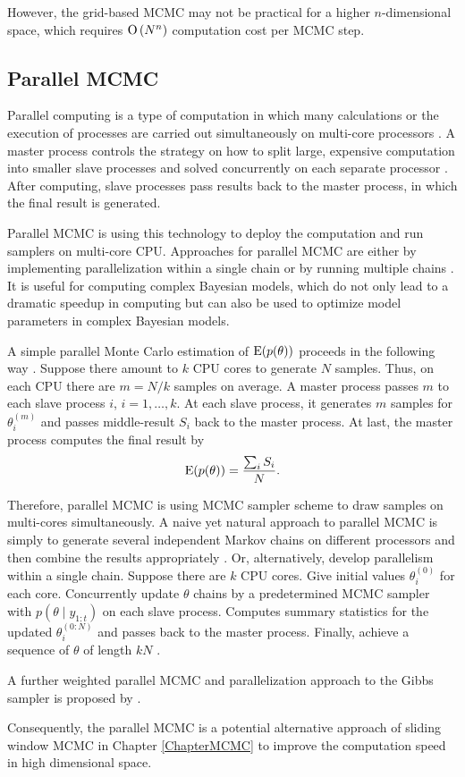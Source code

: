 However, the grid-based MCMC may not be practical for a higher $n$-dimensional space, which requires ${\rm O}\left(N^n\right)$ computation cost per MCMC step. 


\subsection*{Parallel MCMC}

Parallel computing is a type of computation in which many calculations or the execution of processes are carried out simultaneously on multi-core processors \cite{asanovic2006landscape}. A master process controls the strategy on how to split large, expensive computation into smaller slave processes and solved concurrently on each separate processor \cite{Almasi1994Highly}. After computing, slave processes pass results back to the master process, in which the final result is generated. 

Parallel MCMC is using this technology to deploy the computation and run samplers on multi-core CPU. Approaches for parallel MCMC are either by implementing parallelization within a single chain or by running multiple chains \cite{wu2012parallel}. It is useful for computing complex Bayesian models, which do not only lead to a dramatic speedup in computing but can also be used to optimize model parameters in complex Bayesian models.

A simple parallel Monte Carlo estimation of $\mathrm{E}(p(\theta))$ proceeds in the following way \cite{kontoghiorghes2005handbook}. Suppose there amount to $k$ CPU cores to generate $N$ samples. Thus, on each CPU there are $m=N/k$ samples on average. A master process passes $m$ to each slave process $i$, $i=1,\ldots,k$. At each slave process, it generates $m$ samples for $\theta_i^{(m)}$ and passes middle-result $S_i$ back to the master process. At last, the master process computes the final result by 
\begin{equation*}
\mathrm{E}(p(\theta))=\frac{\sum_i S_i}{N}. 
\end{equation*}

Therefore, parallel MCMC is using MCMC sampler scheme to draw samples on multi-cores simultaneously. A naive yet natural approach to parallel MCMC is simply to generate several independent Markov chains on different
processors and then combine the results appropriately \cite{bradford1996markov} \cite{gelman1992inference}. Or, alternatively, develop parallelism within a single chain. Suppose there are $k$ CPU cores. Give initial values $\theta_i^{(0)}$ for each core. Concurrently update $\theta$ chains by a predetermined MCMC sampler with $p(\theta\mid y_{1:t})$ on each slave process. Computes summary statistics for the updated $\theta_i^{(0: N)}$ and passes back to the master process. Finally, achieve a sequence of $\theta$ of length $kN$ \cite{wu2012parallel}. 

A further weighted parallel MCMC and parallelization approach to the Gibbs sampler is proposed by \cite{vanderwerken2013parallel}.

Consequently, the parallel MCMC is a potential alternative approach of sliding window MCMC in Chapter \ref{ChapterMCMC} to improve the computation speed in high dimensional space. 



